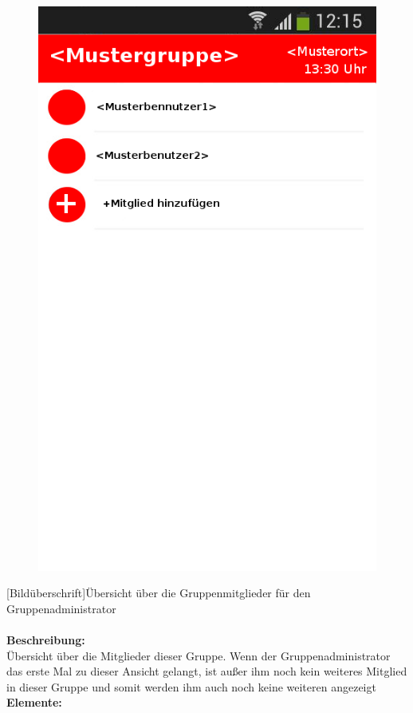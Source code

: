 \begin{figure}
	\includegraphics[scale =1]{resources/images/gruppendetails_Admin.png}
\end{figure}
[Bildüberschrift]Übersicht über die Gruppenmitglieder für den Gruppenadministrator\\ \\
\textbf{Beschreibung:}\\
Übersicht über die Mitglieder dieser Gruppe. Wenn der Gruppenadministrator das erste Mal zu dieser Ansicht gelangt, ist außer ihm noch kein weiteres Mitglied in dieser Gruppe und somit werden ihm auch noch keine weiteren angezeigt\\
\textbf{Elemente:}\\
